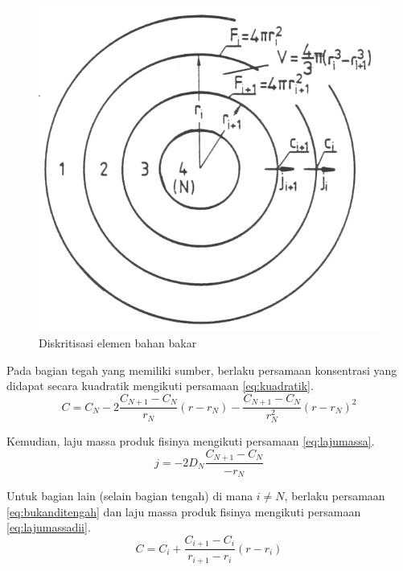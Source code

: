 \documentclass[a4paper,11pt]{report}
\begin{document}
\begin{figure}[h!]
  \begin{center}
    \includegraphics[scale=.35]{pics/diskritisasiFuel.png}
    \caption{Diskritisasi elemen bahan bakar}
    \label{fig:diskritisasi}
  \end{center}
\end{figure}

Pada bagian tegah yang memiliki sumber, berlaku persamaan konsentrasi yang didapat secara kuadratik mengikuti persamaan \ref{eq:kuadratik}. 
\begin{equation}
  C=C_N-2\frac{C_{N+1}-C_N}{r_N}\left(r-r_N\right)-\frac{C_{N+1}-C_N}{r_N^2}\left(r-r_N\right)^2
  \label{eq:kuadratik}
\end{equation}

Kemudian, laju massa produk fisinya mengikuti persamaan \ref{eq:lajumassa}.
\begin{equation}
  j=-2D_N\frac{C_{N+1}-C_N}{-r_N}
  \label{eq:lajumassa}
\end{equation}

Untuk bagian lain (selain bagian tengah) di mana $i \neq N$, berlaku persamaan \ref{eq:bukanditengah} dan laju massa produk fisinya mengikuti persamaan \ref{eq:lajumassadii}. 
\begin{equation}
  C=C_i+\frac{C_{i+1}-C_i}{r_{i+1}-r_i}\left(r-r_i\right)
  \label{eq:bukanditengah}
\end{equation}
\end{document}

